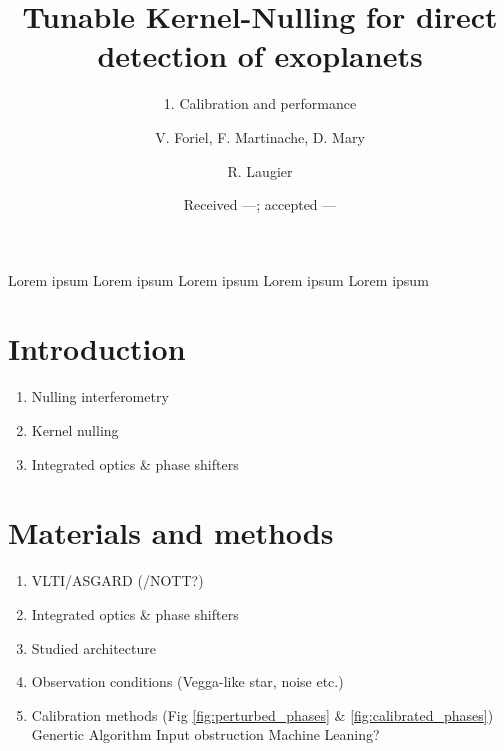 \documentclass{aa}
\begin{document}
 


   \title{Tunable Kernel-Nulling for direct detection of exoplanets}

   \subtitle{1. Calibration and performance}

   \author{V. Foriel,
            F. Martinache,
            D. Mary
            \and
            R. Laugier
          }


   \date{Received ---; accepted ---}

 
  \abstract
   {Lorem ipsum}
   {Lorem ipsum}
   {Lorem ipsum}
   {Lorem ipsum}
   {Lorem ipsum}


   \maketitle
%

\section{Introduction}

    \begin{enumerate}
        \item Nulling interferometry
        \item Kernel nulling
        \item Integrated optics \& phase shifters
    \end{enumerate}


\section{Materials and methods}

    \begin{enumerate}
        \item VLTI/ASGARD (/NOTT?)
        \item Integrated optics \& phase shifters
        \item Studied architecture
        \item Observation conditions (Vegga-like star, noise etc.)
        \item Calibration methods (Fig \ref{fig:perturbed_phases} \& \ref{fig:calibrated_phases})
        \subitem Genertic Algorithm
        \subitem Input obstruction
        \subitem Machine Leaning?
    \end{enumerate}
\end{document}
